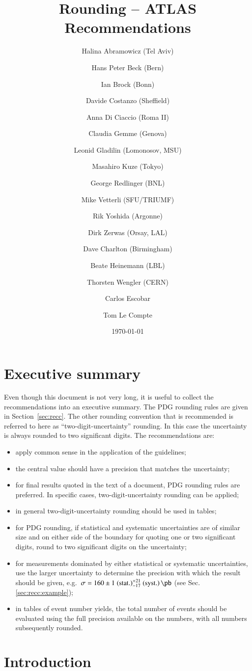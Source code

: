 \documentclass[UKenglish]{latex/atlasdoc}
\title{Rounding -- ATLAS Recommendations}
\author[a]{Halina Abramowicz (Tel Aviv)}
\author[a]{Hans Peter Beck (Bern)}
\author[a]{Ian Brock (Bonn)}
\author[a]{Davide Costanzo (Sheffield)}
\author[a]{Anna Di Ciaccio (Roma II)}
\author[a]{Claudia Gemme (Genova)}
\author[a]{Leonid Gladilin (Lomonosov, MSU)}
\author[a]{Masahiro Kuze (Tokyo)}
\author[a]{George Redlinger (BNL)}
\author[a]{Mike Vetterli (SFU/TRIUMF)}
\author[a]{Rik Yoshida (Argonne)}
\author[a]{Dirk Zerwas (Orsay, LAL)}
\author[a]{Dave Charlton (Birmingham)}
\author[a]{Beate Heinemann (LBL)}
\author[a]{Thorsten Wengler (CERN)}
\author[b]{Carlos Escobar}
\author[c]{Tom Le Compte}
\affil[a]{ATLAS Publications Committee}
\affil[b]{University of Pittsburgh}
\affil[c]{Argonne National Lab.}
\date{\today}
\begin{document}
\section{Executive summary}
\label{sec:summary}

Even though this document is not very long, it is
useful to collect the recommendations into an executive summary.
The PDG rounding rules are given in Section~\ref{sec:recc}. The other
rounding convention that is recommended is referred to here as \enquote{two-digit-uncertainty}
rounding. In this case the uncertainty is always rounded to two
significant digits. The recommendations are:
\begin{itemize}
\item apply common sense in the application of the guidelines;
\item the central value should have a precision that
  matches the uncertainty;
\item for final results quoted in the text of a document, PDG rounding
  rules are preferred. In specific cases, two-digit-uncertainty
  rounding can be applied;
\item in general two-digit-uncertainty rounding should be used in
  tables;
\item for PDG rounding, if statistical and systematic uncertainties are of
similar size and on either side of the boundary for quoting one or two
significant digits, round to two significant digits on the uncertainty;
\item for measurements dominated by either statistical or systematic
  uncertainties, use the larger uncertainty to determine the precision
  with which the result should be given, e.g.\ $\sigma = 160 \pm
  1\stat ^{+21}_{-17}\syst\,\si{\pb}$ (see Sec.\ref{sec:recc:example});
\item in tables of event number yields, the total number of events
  should be evaluated using the full precision available on the numbers,
with all numbers subsequently rounded.
 \end{itemize}


\section{Introduction}
\label{sec:intro}
\end{document}
